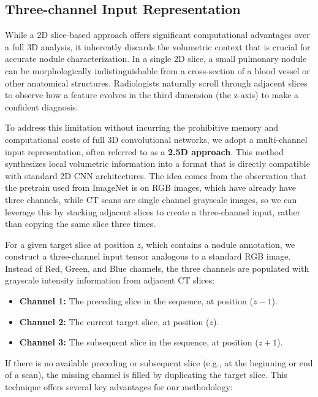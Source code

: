 \subsection{Three-channel Input Representation}
\label{sec:2.5d_approach}

While a 2D slice-based approach offers significant computational advantages over a full 3D analysis, it inherently discards the volumetric context that is crucial for accurate nodule characterization. In a single 2D slice, a small pulmonary nodule can be morphologically indistinguishable from a cross-section of a blood vessel or other anatomical structures. Radiologists naturally scroll through adjacent slices to observe how a feature evolves in the third dimension (the z-axis) to make a confident diagnosis.

To address this limitation without incurring the prohibitive memory and computational costs of full 3D convolutional networks, we adopt a multi-channel input representation, often referred to as a \textbf{2.5D approach}. This method synthesizes local volumetric information into a format that is directly compatible with standard 2D CNN architectures.
The idea comes from the observation that the pretrain used from ImageNet is on RGB images, which have already have three channels, while CT scans are single channel grayscale images, so we can leverage this by stacking adjacent slices to create a three-channel input, rather than copying the same slice three times.

For a given target slice at position $z$, which contains a nodule annotation, we construct a three-channel input tensor analogous to a standard RGB image. Instead of Red, Green, and Blue channels, the three channels are populated with grayscale intensity information from adjacent CT slices:

\begin{itemize}
    \item \textbf{Channel 1:} The preceding slice in the sequence, at position ($z-1$).
    \item \textbf{Channel 2:} The current target slice, at position ($z$).
    \item \textbf{Channel 3:} The subsequent slice in the sequence, at position ($z+1$).
\end{itemize}
If there is no available preceding or subsequent slice (e.g., at the beginning or end of a scan), the missing channel is filled by duplicating the target slice.
This technique offers several key advantages for our methodology:


